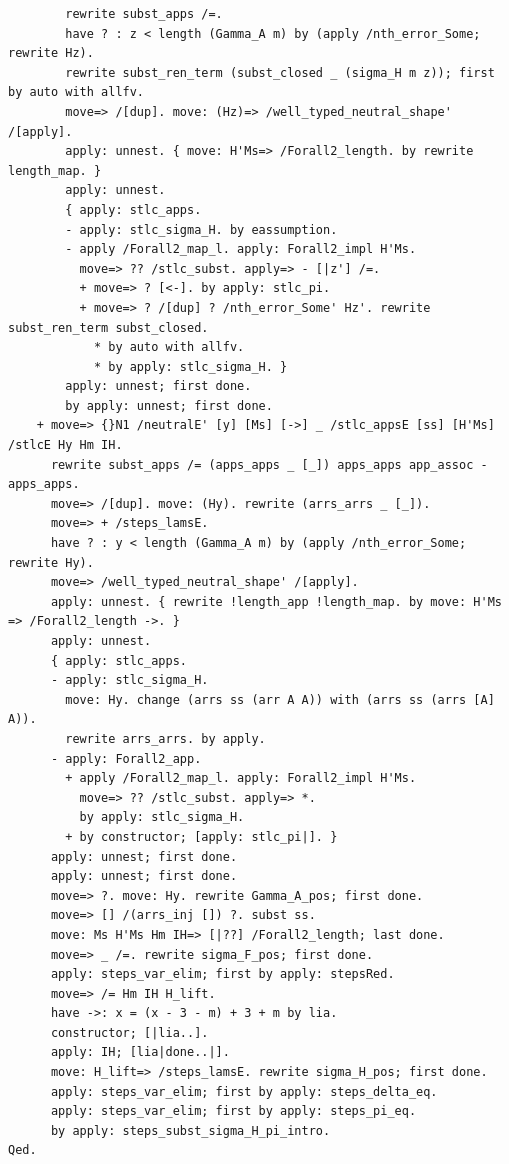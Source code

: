 \begin{lstlisting}
        rewrite subst_apps /=.
        have ? : z < length (Gamma_A m) by (apply /nth_error_Some; rewrite Hz).
        rewrite subst_ren_term (subst_closed _ (sigma_H m z)); first by auto with allfv.
        move=> /[dup]. move: (Hz)=> /well_typed_neutral_shape' /[apply].
        apply: unnest. { move: H'Ms=> /Forall2_length. by rewrite length_map. }
        apply: unnest.
        { apply: stlc_apps.
        - apply: stlc_sigma_H. by eassumption.
        - apply /Forall2_map_l. apply: Forall2_impl H'Ms.
          move=> ?? /stlc_subst. apply=> - [|z'] /=.
          + move=> ? [<-]. by apply: stlc_pi.
          + move=> ? /[dup] ? /nth_error_Some' Hz'. rewrite subst_ren_term subst_closed.
            * by auto with allfv.
            * by apply: stlc_sigma_H. }
        apply: unnest; first done.
        by apply: unnest; first done.
    + move=> {}N1 /neutralE' [y] [Ms] [->] _ /stlc_appsE [ss] [H'Ms] /stlcE Hy Hm IH.
      rewrite subst_apps /= (apps_apps _ [_]) apps_apps app_assoc -apps_apps.
      move=> /[dup]. move: (Hy). rewrite (arrs_arrs _ [_]).
      move=> + /steps_lamsE.
      have ? : y < length (Gamma_A m) by (apply /nth_error_Some; rewrite Hy).
      move=> /well_typed_neutral_shape' /[apply].
      apply: unnest. { rewrite !length_app !length_map. by move: H'Ms => /Forall2_length ->. }
      apply: unnest.
      { apply: stlc_apps.
      - apply: stlc_sigma_H.
        move: Hy. change (arrs ss (arr A A)) with (arrs ss (arrs [A] A)).
        rewrite arrs_arrs. by apply.
      - apply: Forall2_app.
        + apply /Forall2_map_l. apply: Forall2_impl H'Ms.
          move=> ?? /stlc_subst. apply=> *.
          by apply: stlc_sigma_H.
        + by constructor; [apply: stlc_pi|]. }
      apply: unnest; first done.
      apply: unnest; first done.
      move=> ?. move: Hy. rewrite Gamma_A_pos; first done.
      move=> [] /(arrs_inj []) ?. subst ss.
      move: Ms H'Ms Hm IH=> [|??] /Forall2_length; last done.
      move=> _ /=. rewrite sigma_F_pos; first done.
      apply: steps_var_elim; first by apply: stepsRed.
      move=> /= Hm IH H_lift.
      have ->: x = (x - 3 - m) + 3 + m by lia.
      constructor; [|lia..].
      apply: IH; [lia|done..|].
      move: H_lift=> /steps_lamsE. rewrite sigma_H_pos; first done.
      apply: steps_var_elim; first by apply: steps_delta_eq.
      apply: steps_var_elim; first by apply: steps_pi_eq.
      by apply: steps_subst_sigma_H_pi_intro.
Qed.


\end{lstlisting}
